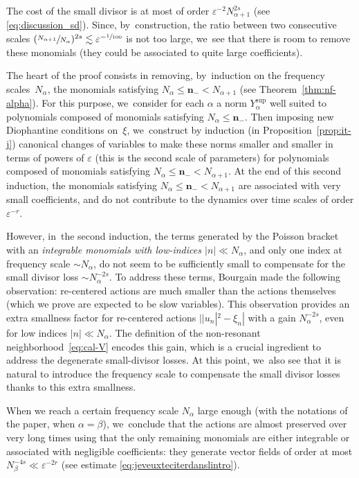 \documentclass[JEP,XML,SOM,Unicode,published]{cedram}
\theoremstyle{plain}
\theoremstyle{definition}
\newcommand{\nb}{{\boldsymbol n}}
\newcommand{\1}{\mathbf{1}}
\newcommand{\Ysup}[1]{Y_{#1}^{\mathrm{sup}}}
\let\epsilon\varepsilon
\begin{document}
The cost of the small divisor is at most of order $\varepsilon^{-2}N_{\alpha+1}^{2s}$ (see \eqref{eq:discussion_sd}). Since, by~construction, the ratio between two consecutive scales $(\sfrac{N_{\alpha+1}}{N_{\alpha}})^{2s}\lesssim \epsilon^{-\sfrac{1}{100}}$ is not too large, we~see that there is room to remove these monomials (they could be associated to quite large coefficients).

The heart of the proof consists in removing, by~induction on the frequency scales~$N_{\alpha}$, the monomials satisfying $N_{\alpha} \leq \nb_{-} < N_{\alpha+1}$ (see Theorem~\ref{thm:nf-alpha}). For this purpose, we~consider for each $\alpha$ a norm $\Ysup{\alpha}$ well suited to polynomials composed of monomials satisfying $N_{\alpha}\leq \nb_{-}$.
Then imposing new Diophantine conditions on~$\xi$, we~construct by induction (in Proposition~\ref{prop:it-j}) canonical changes of variables to make these norms smaller and smaller in terms of powers of $\varepsilon$ (this is the second scale of parameters) for polynomials composed of monomials satisfying $N_{\alpha} \leq \nb_{-} < N_{\alpha+1}$. At the end of this second induction, the monomials satisfying $N_{\alpha} \leq \nb_{-} < N_{\alpha+1}$ are associated with very small coefficients, and do not contribute to the dynamics over time scales of order $\epsilon^{-r}$.

However, in~the second induction, the terms generated by the Poisson bracket with an \emph{integrable monomials with low-indices $|n|\ll N_{\alpha}$}, and only one index at frequency scale $\sim N_{\alpha}$, do not seem to be sufficiently small to compensate for the small divisor loss $\sim N_{\alpha}^{-2s}$. To address these terms, Bourgain made the following observation: re-centered actions are much smaller than the actions themselves (which we prove are expected to be slow variables). This observation provides an extra smallness factor for re-centered actions $||u_{n}|^{2}-\xi_n|$ with a gain $N_{\alpha}^{-2s}$, even for low indices $|n|\ll N_{\alpha}$. The definition of the non-resonant neighborhood~\eqref{eq:cal-V} encodes this gain, which is a crucial ingredient to address the degenerate small-divisor losses. At this point, we~also see that it is natural to introduce the frequency scale to compensate the small divisor losses thanks to this extra smallness.

When we reach a certain frequency scale $N_{\alpha}$ large enough (with the notations of the paper, when $\alpha=\beta$), we~conclude that the actions are almost preserved over very long times using that the only remaining monomials are either integrable or associated with negligible coefficients: they generate vector fields of order at most $N_\beta^{-4s} \ll \varepsilon^{-2r}$ (see estimate \eqref{eq:jeveuxteciterdanslintro}).\enlargethispage{.5\baselineskip}%
\end{document}

